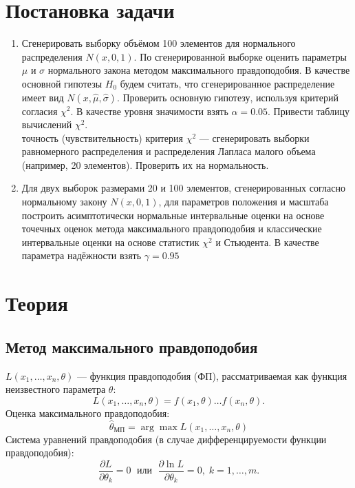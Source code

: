 \documentclass[12pt]{article}
\begin{document}
\section{Постановка задачи}
\begin{enumerate}
    \item  Сгенерировать выборку объёмом 100 элементов для нормального распределения $N(x,0,1)$. По сгенерированной выборке оценить параметры $\mu$ и $\sigma$ нормального закона методом максимального правдоподобия. В качестве основной гипотезы $H_0$ будем считать, что сгенерированное распределение имеет вид $N(x, \hat{\mu}, \hat{\sigma})$. Проверить основную гипотезу, используя критерий согласия $\chi^2$.  В качестве уровня значимости взять $\alpha = 0.05$. Привести таблицу вычислений $\chi^2$.\\
     точность (чувствительность) критерия $\chi^2$ --- сгенерировать выборки равномерного распределения и распределения Лапласа малого объема (например, 20 элементов). Проверить их на нормальность.
    \item Для двух выборок размерами 20 и 100 элементов, сгенерированных согласно нормальному закону $N(x,0,1)$, для параметров положения и масштаба построить асимптотически нормальные интервальные оценки на основе точечных оценок метода максимального правдоподобия и классические интервальные оценки на основе статистик $\chi^2$ и Стьюдента. В качестве параметра надёжности взять $\gamma = 0.95$
\end{enumerate}

\newpage
\section{Теория}
\subsection{Метод максимального правдоподобия}
$L(x_1,\dots,x_n,\theta)$ --- функция правдоподобия (ФП), рассматриваемая как функция неизвестного параметра $\theta$:
\begin{equation}
    L(x_1,\dots,x_n,\theta) = f(x_1,\theta)\dots f(x_n, \theta).
\end{equation}
Оценка максимального правдоподобия:
\begin{equation}
    \hat{\theta}_{\text{МП}} = \arg\max L(x_1,\dots,x_n,\theta)
\end{equation}
Система уравнений правдоподобия (в случае дифференцируемости функции правдоподобия):
\begin{equation}
    \frac{\partial L}{\partial \theta_k} = 0 \; \text{ или } \; \frac{\partial \ln L}{\partial \theta_k} = 0, \; k = 1,\dots,m.
    \label{difEquation}
\end{equation}
\end{document}
